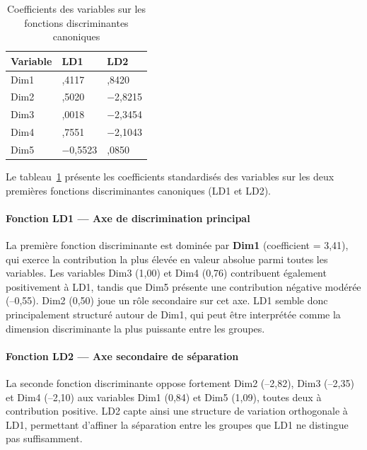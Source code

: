 \documentclass[12pt, a4paper, oneside]{report}
\begin{document}
		\begin{table}[H]
			\centering
			\caption{Coefficients des variables sur les fonctions discriminantes canoniques}
			\label{tab:variables_ld}
			\renewcommand{\arraystretch}{1.4}
			\begin{tabularx}{\textwidth}{>{\raggedright\arraybackslash}X
					>{\centering\arraybackslash}p{3cm}
					>{\centering\arraybackslash}p{3cm}}
				\toprule
				\rowcolor{primary!15}
				\textbf{Variable} & \textbf{LD1} & \textbf{LD2} \\
				\midrule
				
				Dim1
				& 3,4117 & 0,8420 \\
				
				\rowcolor{lightgray}
				Dim2
				& 0,5020 & $-$2,8215 \\
				
				Dim3
				& 1,0018 & $-$2,3454 \\
				
				\rowcolor{lightgray}
				Dim4
				& 0,7551 & $-$2,1043 \\
				
				Dim5
				& $-$0,5523 & 1,0850 \\
				
				\bottomrule
			\end{tabularx}
		\end{table}
		
		
		
		 Le tableau~\ref{tab:variables_ld} présente les coefficients standardisés des variables
		 sur les deux premières fonctions discriminantes canoniques (LD1 et LD2).
		
		 \paragraph{Fonction LD1 — Axe de discrimination principal}
		 La première fonction discriminante est dominée par \textbf{Dim1} (coefficient = 3,41),
		 qui exerce la contribution la plus élevée en valeur absolue parmi toutes les variables.
		 Les variables Dim3 (1,00) et Dim4 (0,76) contribuent également positivement à LD1,
		 tandis que Dim5 présente une contribution négative modérée (--0,55). Dim2 (0,50) joue
		 un rôle secondaire sur cet axe. LD1 semble donc principalement structuré autour de
		 Dim1, qui peut être interprétée comme la dimension discriminante la plus puissante
		 entre les groupes.
		
		 \paragraph{Fonction LD2 — Axe secondaire de séparation}
		 La seconde fonction discriminante oppose fortement Dim2 (--2,82), Dim3 (--2,35)
		 et Dim4 (--2,10) aux variables Dim1 (0,84) et Dim5 (1,09), toutes deux à contribution
		 positive. LD2 capte ainsi une structure de variation orthogonale à LD1, permettant
		 d'affiner la séparation entre les groupes que LD1 ne distingue pas suffisamment.\\
		 
\end{document}
